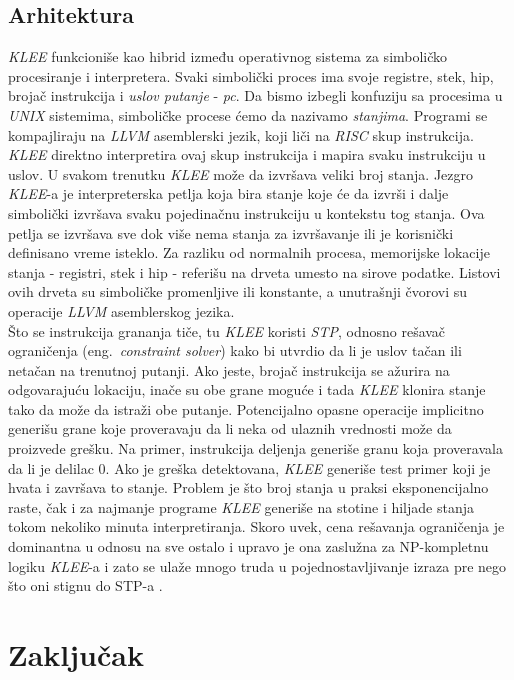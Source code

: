 \documentclass[a4paper]{article}
\begin{document}
\subsection{Arhitektura}
\label{subsec:podnaslov2}
\textit{KLEE} funkcioniše kao hibrid između operativnog sistema za simboličko procesiranje i interpretera. Svaki simbolički proces ima svoje registre, stek, hip, brojač instrukcija i \textit{uslov putanje} - \textit{pc}. Da bismo izbegli konfuziju sa procesima u \textit{UNIX} sistemima, simboličke procese ćemo da nazivamo \textit{stanjima}. Programi se kompajliraju na \textit{LLVM} asemblerski jezik, koji liči na \textit{RISC}  skup instrukcija. \textit{KLEE} direktno interpretira ovaj skup instrukcija i mapira svaku instrukciju u uslov. U svakom trenutku \textit{KLEE} može da izvršava veliki broj stanja. Jezgro \textit{KLEE}-a je interpreterska petlja koja bira stanje koje će da izvrši i dalje simbolički izvršava svaku pojedinačnu instrukciju u kontekstu tog stanja. Ova petlja se izvršava sve dok više nema stanja za izvršavanje ili je korisnički definisano vreme isteklo. Za razliku od normalnih procesa, memorijske lokacije stanja - registri, stek i hip -  referišu na drveta umesto na sirove podatke. Listovi ovih drveta su simboličke promenljive ili konstante, a unutrašnji čvorovi su operacije \textit{LLVM} asemblerskog jezika. \\

Što se instrukcija grananja tiče, tu \textit{KLEE} koristi \textit{STP}, odnosno rešavač ograničenja (eng.~{\em constraint solver}) kako bi utvrdio da li je uslov tačan ili netačan na trenutnoj putanji. Ako jeste, brojač instrukcija se ažurira na odgovarajuću lokaciju, inače su obe grane moguće i tada \textit{KLEE} klonira stanje tako da može da istraži obe putanje. Potencijalno opasne operacije implicitno generišu grane koje proveravaju da li neka od ulaznih vrednosti može da proizvede grešku. Na primer, instrukcija deljenja generiše granu koja proveravala da li je delilac 0. Ako je greška detektovana, \textit{KLEE} generiše test primer koji je hvata i završava to stanje. Problem je što broj stanja u praksi eksponencijalno raste, čak i za najmanje programe \textit{KLEE} generiše na stotine i hiljade stanja tokom nekoliko minuta interpretiranja. Skoro uvek, cena rešavanja ograničenja je dominantna u odnosu na sve ostalo i upravo je ona zaslužna za NP-kompletnu logiku \textit{KLEE}-a i zato se ulaže mnogo truda u pojednostavljivanje izraza pre nego što oni stignu do STP-a \cite{klee}. 


\section{Zaključak}
\label{sec:zakljucak}
\end{document}
